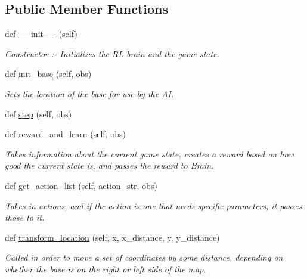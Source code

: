 \subsection*{Public Member Functions}
\begin{DoxyCompactItemize}
\item 
def \hyperlink{classBotty__McBotface_1_1Botty_a2b20c5c22329f5a75ef3c343e630a4c1}{\+\_\+\+\_\+init\+\_\+\+\_\+} (self)\hypertarget{classBotty__McBotface_1_1Botty_a2b20c5c22329f5a75ef3c343e630a4c1}{}\label{classBotty__McBotface_1_1Botty_a2b20c5c22329f5a75ef3c343e630a4c1}

\begin{DoxyCompactList}\small\item\em Constructor \+:-\/ Initializes the RL brain and the game state. \end{DoxyCompactList}\item 
def \hyperlink{classBotty__McBotface_1_1Botty_a979fe38b2208653ab5195c7115e978c4}{init\+\_\+base} (self, obs)
\begin{DoxyCompactList}\small\item\em Sets the location of the base for use by the AI. \end{DoxyCompactList}\item 
def \hyperlink{classBotty__McBotface_1_1Botty_a6ad2ce98b25c627204c31f37d26d40dc}{step} (self, obs)
\item 
def \hyperlink{classBotty__McBotface_1_1Botty_aaf8459960013f8b5e21e0928d7031026}{reward\+\_\+and\+\_\+learn} (self, obs)
\begin{DoxyCompactList}\small\item\em Takes information about the current game state, creates a \textquotesingle{}reward\textquotesingle{} based on how good the current state is, and passes the reward to Brain. \end{DoxyCompactList}\item 
def \hyperlink{classBotty__McBotface_1_1Botty_a230761c2312622094689a0950b1851a9}{get\+\_\+action\+\_\+list} (self, action\+\_\+str, obs)
\begin{DoxyCompactList}\small\item\em Takes in actions, and if the action is one that needs specific parameters, it passes those to it. \end{DoxyCompactList}\item 
def \hyperlink{classBotty__McBotface_1_1Botty_a0d6257b0994cb62993fd6346f77d97dc}{transform\+\_\+location} (self, x, x\+\_\+distance, y, y\+\_\+distance)
\begin{DoxyCompactList}\small\item\em Called in order to move a set of coordinates by some distance, depending on whether the base is on the right or left side of the map. \end{DoxyCompactList}\end{DoxyCompactItemize}
